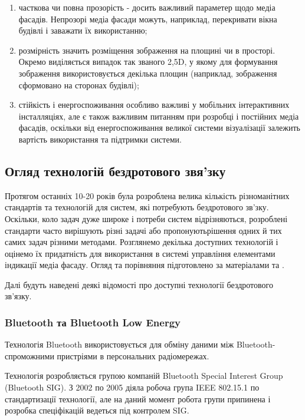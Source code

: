 \documentclass[a4paper,ukrainian,utf8,nocolumnsxix,floatsection,equationsection]{eskdtext}
\renewcommand\paragraph{\subsubsection}
\begin{document}
\begin{enumerate}
	\item часткова чи повна прозорість - досить важливий параметер щодо медіа фасадів. Непрозорі медіа фасади можуть, наприклад, перекривати вікна будівлі і заважати їх використанню;
	\item розмірність значить розміщення зображення на площині чи в просторі. Окремо виділяється випадок так званого 2,5D, у якому для формування зображення використовується декілька площин (наприклад, зображення сформовано на сторонах будівлі);
	\item стійкість і енергоспоживання особливо важливі у мобільних інтерактивних інсталляціях, але є також важливим питанням при розробці і постійних медіа фасадів, оскільки від енергоспоживання великої системи візуалізації залежить вартість використання та підтримки системи.
\end{enumerate}


\subsection{Огляд технологій бездротового звя’зку}

Протягом останніх 10-20 років була розроблена велика кількість різноманітних стандартів та технологій для систем, які потребують бездротового зв’зку. Оскільки, коло задач дуже широке і потреби систем відрізняються, розроблені стандарти часто вирішують різні задачі або пропонуютьрішення одних й тих самих задач різними методами. Розглянемо декілька доступних технологій і оцінемо їх придатність для використання в системі управління елементами індикації медіа фасаду. Огляд та порівняння підготовлено за матеріалами \cite{comparative:wireless:protocols} та \cite{garcia2008:problem:solving}.

Далі будуть наведені деякі відомості про доступні технології бездротового зв’язку.

\paragraph{Bluetooth та Bluetooth Low Energy} %
\label{par:bluetooth_bluetooth_low_energy}

Технологія Bluetooth використовується для обміну даними між Bluetooth-спроможними пристріями в персональних радіомережах. 

Технологія розробляється групою компаній Bluetooth Special Interest Group (Bluetooth SIG). З 2002 по 2005 діяла робоча група IEEE 802.15.1 по стандартизації технології, але на даний момент робота групи припинена і розробка спеціфікацій ведеться під контролем SIG.
\end{document}
